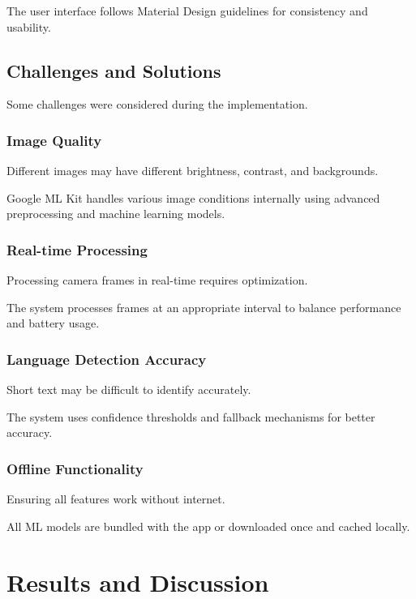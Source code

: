 \documentclass[12pt,a4paper]{report}
\begin{document}
The user interface follows Material Design guidelines for consistency and usability.

\section{Challenges and Solutions}

Some challenges were considered during the implementation.

\subsection{Image Quality}

Different images may have different brightness, contrast, and backgrounds.

Google ML Kit handles various image conditions internally using advanced preprocessing and machine learning models.

\subsection{Real-time Processing}

Processing camera frames in real-time requires optimization.

The system processes frames at an appropriate interval to balance performance and battery usage.

\subsection{Language Detection Accuracy}

Short text may be difficult to identify accurately.

The system uses confidence thresholds and fallback mechanisms for better accuracy.

\subsection{Offline Functionality}

Ensuring all features work without internet.

All ML models are bundled with the app or downloaded once and cached locally.


\chapter{Results and Discussion}
\end{document}
